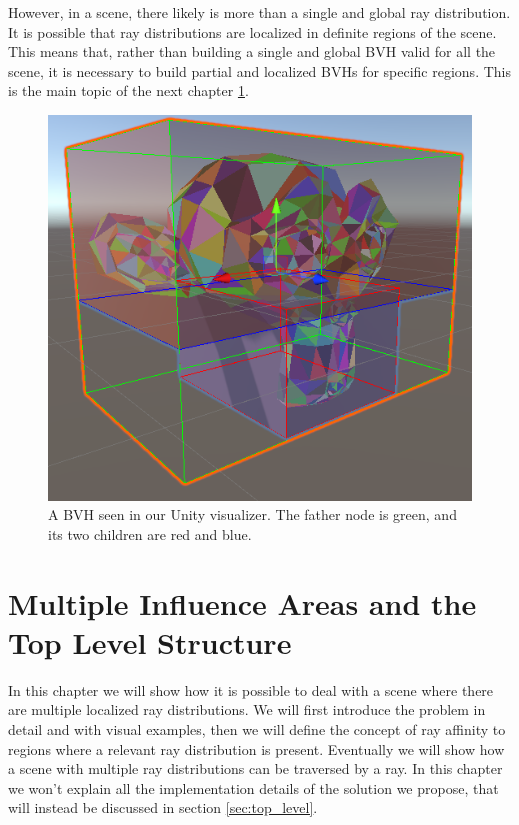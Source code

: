 \documentclass{PoliMi_MasterThesis}
\begin{document}
However, in a scene, there likely is more than a single and global ray distribution. It is possible that ray distributions are localized in definite regions of the scene. This means that, rather than building a single and global BVH valid for all the scene, it is necessary to build partial and localized BVHs for specific regions. This is the main topic of the next chapter \ref{ch:multi_influence_areas}.

\begin{figure}[H]
    \centering
    \includegraphics[width=\textwidth]{Images/suzanne_root_visualizer.png}
    \caption{A BVH seen in our Unity visualizer. The father node is green, and its two children are red and blue.}
    \label{fig:suzanne_root_visualizer}
\end{figure}

\chapter{Multiple Influence Areas and the Top Level Structure} \label{ch:multi_influence_areas}
In this chapter we will show how it is possible to deal with a scene where there are multiple localized ray distributions. We will first introduce the problem in detail and with visual examples, then we will define the concept of ray affinity to regions where a relevant ray distribution is present. Eventually we will show how a scene with multiple ray distributions can be traversed by a ray. In this chapter we won't explain all the implementation details of the solution we propose, that will instead be discussed in section \ref{sec:top_level}.
\end{document}
